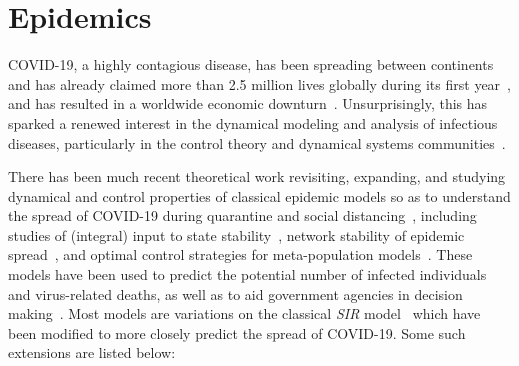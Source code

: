 \chapter{Epidemics}
\label{chap:epidemic}

COVID-19, a highly contagious disease, has been spreading between continents and has already claimed more than 2.5 million lives globally during its first year~\cite{worldcoronavirus}, and has resulted in a worldwide economic downturn~\cite{coibion2020cost}. Unsurprisingly, this has sparked a renewed  interest in the dynamical modeling and analysis of infectious diseases, particularly in the control theory and dynamical systems communities~\cite{weitz20,parisini20,franco20,levine20,giordano20,leonard20,johnston20,sontag20,sadeghi20}.

There has been much recent theoretical work revisiting, expanding, and studying dynamical and control properties of classical epidemic models so as to understand the spread of COVID-19 during quarantine and social distancing~\cite{HERNANDEZVARGAS2020448,PARE2020345,SCHARBARG2020409,ANSUMALI2020432,HERNANDEZVARGAS2020343,ABUIN2020457},
including 
studies of (integral) input to state stability~\cite{ito2020feedback}, network stability of epidemic spread~\cite{tian2020global, liu2020stability}, and optimal control strategies for meta-population models~\cite{liu2020epidemic}.
These models have been used to predict the potential number of infected individuals and virus-related deaths, as well as to aid government agencies in decision making~\cite{stewart2020control}. 
Most models are variations on the classical \textit{SIR} model~\cite{kermack1927contribution, brauer2019mathematical, albi2020control} which have been modified to more closely predict the spread of COVID-19.  Some such extensions are listed below:

